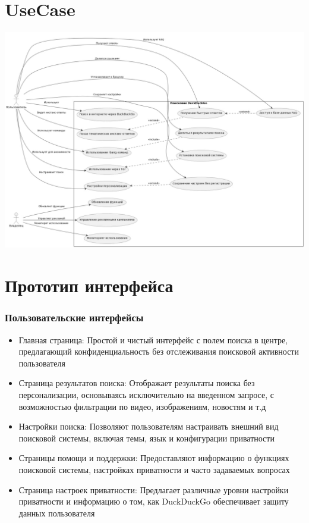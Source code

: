 \documentclass[12pt,a4paper]{article}
\begin{document}
\part*{UseCase}
\begin{center}
    \includegraphics[width=\textwidth]{usecase.jpg}
\end{center}
\part*{Прототип интерфейса}
\section{Пользовательские интерфейсы}
\begin{itemize}
    \item Главная страница: Простой и чистый интерфейс с полем поиска в центре, предлагающий конфиденциальность без отслеживания поисковой активности пользователя
    \item Страница результатов поиска: Отображает результаты поиска без персонализации, основываясь исключительно на введенном запросе, с возможностью фильтрации по видео, изображениям, новостям и т.д
    \item Настройки поиска: Позволяют пользователям настраивать внешний вид поисковой системы, включая темы, язык и конфигурации приватности
    \item Страницы помощи и поддержки: Предоставляют информацию о функциях поисковой системы, настройках приватности и часто задаваемых вопросах
    \item Страница настроек приватности: Предлагает различные уровни настройки приватности и информацию о том, как DuckDuckGo обеспечивает защиту данных пользователя
\end{itemize}
\end{document}
